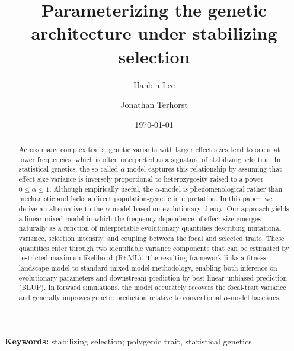 \documentclass[10pt]{article}
\title{
    Parameterizing the genetic architecture under stabilizing selection
}
\author[1,$*$]{Hanbin Lee}
\author[1,$*$]{Jonathan Terhorst}
\affil[1]{Department of Statistics, University of Michigan, Ann Arbor, MI, 48109, USA}
\affil[$*$]{Correspondence to \texttt{hblee@umich.edu} and \texttt{jonth@umich.edu}}
\date{\today}
\begin{document}
\maketitle

\begin{abstract}
    Across many complex traits, genetic variants with larger effect sizes
    tend to occur at lower frequencies, which is often interpreted as a signature of stabilizing selection.
    In statistical genetics, the so-called $\alpha$-model captures this relationship by assuming that effect size variance is inversely proportional to heterozygosity raised to a power $0\le\alpha\le 1$.
    Although empirically useful, the $\alpha$-model is phenomenological rather than mechanistic and lacks a direct population-genetic interpretation.
    In this paper, we derive an alternative to the $\alpha$-model based on evolutionary theory. 
    Our approach yields a linear mixed model in which the frequency dependence of effect size emerges naturally as a function of interpretable evolutionary quantities describing mutational variance, selection intensity, and coupling between the focal and selected traits.
    These quantities enter through two identifiable variance components that can be estimated by restricted maximum likelihood (REML).
    The resulting framework links a fitness-landscape model to standard mixed-model methodology, enabling both inference on evolutionary parameters and downstream prediction by best linear unbiased prediction (BLUP).
    In forward simulations, the model accurately recovers the focal-trait variance and generally improves genetic prediction relative to conventional $\alpha$-model baselines.
\end{abstract}

\vspace{1em} 
\noindent \textbf{Keywords:} stabilizing selection; polygenic trait, statistical genetics
\end{document}
